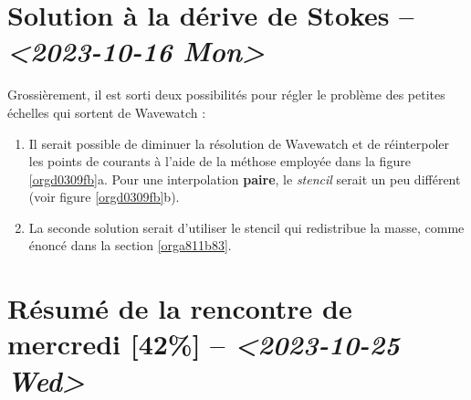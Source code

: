 \documentclass[10pt]{report}
\numberwithin{equation}{section}
\begin{document}
\section{Solution à la dérive de Stokes -- \textit{<2023-10-16 Mon>}}
\label{sec:org7d88a85}
Grossièrement, il est sorti deux possibilités pour régler le problème des petites échelles qui sortent de Wavewatch :
\begin{enumerate}
\item Il serait possible de diminuer la résolution de Wavewatch et de réinterpoler les points de courants à l'aide de la méthose employée dans la figure \ref{orgd0309fb}a.
Pour une interpolation \textbf{paire}, le \emph{stencil} serait un peu différent (voir figure \ref{orgd0309fb}b).

\item La seconde solution serait d'utiliser le stencil qui redistribue la masse, comme énoncé dans la section \ref{orga811b83}.
\end{enumerate}

\section{Résumé de la rencontre de mercredi [42\%]  -- \textit{<2023-10-25 Wed>}}
\label{sec:orgc174d6a}
\end{document}
